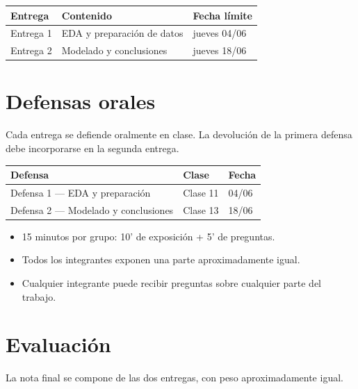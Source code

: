 \documentclass[12pt]{article}
\begin{document}
\begin{center}
\begin{tabular}{l l l}
\toprule
\textbf{Entrega} & \textbf{Contenido} & \textbf{Fecha límite} \\
\midrule
Entrega 1 & EDA y preparación de datos & jueves 04/06 \\
Entrega 2 & Modelado y conclusiones & jueves 18/06 \\
\bottomrule
\end{tabular}
\end{center}

\section{Defensas orales}

Cada entrega se defiende oralmente en clase. La devolución de la primera defensa debe incorporarse en la segunda entrega.

\begin{center}
\begin{tabular}{l l l}
\toprule
\textbf{Defensa} & \textbf{Clase} & \textbf{Fecha} \\
\midrule
Defensa 1 --- EDA y preparación & Clase 11 & 04/06 \\
Defensa 2 --- Modelado y conclusiones & Clase 13 & 18/06 \\
\bottomrule
\end{tabular}
\end{center}

\begin{itemize}
    \item 15 minutos por grupo: 10' de exposición + 5' de preguntas.
    \item Todos los integrantes exponen una parte aproximadamente igual.
    \item Cualquier integrante puede recibir preguntas sobre cualquier parte del trabajo.
\end{itemize}

\section{Evaluación}

La nota final se compone de las dos entregas, con peso aproximadamente igual.
\end{document}
